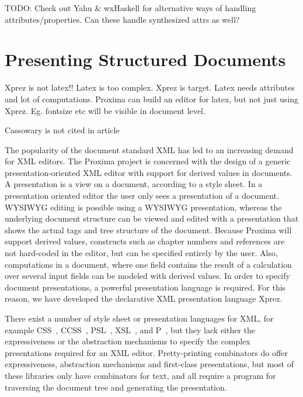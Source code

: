 
\bc
TODO:
Check out  Yahu & wxHaskell for alternative ways of handling attributes/properties. Can these handle synthesized attrs as well?
\ec


\def\ch{chap:presenting}
\chapter{Presenting Structured Documents}
\label{\ch}

{\sc Xprez} is not latex!! Latex is too complex. {\sc Xprez} is target. Latex needs attributes and lot of computations. Proxima can build an editor for latex, but not just using {\sc Xprez}. Eg. fontsize etc will be visible in document level.

Cassowary is not cited in article


The popularity of the document standard XML has led to an increasing demand for XML editors. The Proxima project is concerned with the design of a generic presentation-oriented XML editor with support for derived values in documents. A presentation is a view on a document, according to a style sheet. In a presentation oriented editor the user only sees a presentation of a document. WYSIWYG editing is possible using a WYSIWYG presentation, whereas the underlying document structure can be viewed and edited with a presentation that shows the actual tags and tree structure of the document. Because Proxima will support derived values, constructs such as chapter numbers and references are not hard-coded in the editor, but can be specified entirely by the user. Also, computations in a document, where one field contains the result of a calculation over several input fields can be modeled with derived values. In order to specify document presentations, a powerful presentation language is required. For this reason, we have developed the declarative XML presentation language {\sc Xprez}.

There exist a number of style sheet or presentation languages for XML, for example CSS~\cite{css}, CCSS~\cite{ccss}, PSL~\cite{psl}, XSL~\cite{xsl}, and P~\cite{thot}, but they lack either the expressiveness or the abstraction mechanisms to specify the complex presentations required for an XML editor. Pretty-printing combinators \cite{oppen,swierstra,hughes,kahl,brand} do offer expressiveness, abstraction mechanisms and first-class presentations, but most of these libraries only have combinators for text, and all require a program for traversing the document tree and generating the presentation. 

